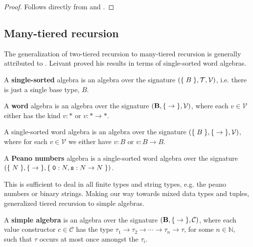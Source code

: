 \begin{proof} Follows directly from  and
. \end{proof}

\subsection{Many-tiered recursion}

The generalization of two-tiered recursion to many-tiered recursion is
generally attributed to \cite{leivant-1995}. Leivant proved his results in
terms of single-sorted word algebras.

\begin{definition} A \textbf{single-sorted} algebra is an algebra over the
signature ${\mathopen{}\left({\mathopen{}\left\{\mathrel{}{B}\mathrel{}\right\}\mathclose{}, \mathcal{T}, \mathcal{V}}\right)\mathclose{}}$, i.e. there is just a single
base type, $B$. \end{definition}

\begin{definition} A \textbf{word} algebra is an algebra over the signature
${\mathopen{}\left({\mathbf{B}, \mathopen{}\left\{\mathrel{}{\rightarrow}\mathrel{}\right\}\mathclose{}, \mathcal{V}}\right)\mathclose{}}$, where each $v \in
\mathcal{V}$ either has the kind $v : *$ or $v : *\rightarrow *$.
\end{definition}

\begin{example} A single-sorted word algebra is an algebra over the signature
${\mathopen{}\left({\mathopen{}\left\{\mathrel{}{B}\mathrel{}\right\}\mathclose{},\mathopen{}\left\{\mathrel{}{\rightarrow}\mathrel{}\right\}\mathclose{}, \mathcal{V}}\right)\mathclose{}}$, where for each $v \in
\mathcal{V}$ we either have $v : B$ or $v : B\rightarrow B$. \end{example}

\begin{definition} A \textbf{Peano numbers} algebra is a single-sorted word
algebra over the signature ${\mathopen{}\left({\mathopen{}\left\{\mathrel{}{N}\mathrel{}\right\}\mathclose{}, \mathopen{}\left\{\mathrel{}{\rightarrow}\mathrel{}\right\}\mathclose{},\mathopen{}\left\{\mathrel{}{\mathtt{0} : N,
\mathtt{s} : N \rightarrow N}\mathrel{}\right\}\mathclose{}}\right)\mathclose{}}$. \end{definition}


This is sufficient to deal in all finite types and string types, e.g.  the
peano numbers or binary strings. Making our way towards mixed data types and
tuples, \cite{marion-2003} generalized tiered recursion to simple algebras.
 
\begin{definition} A \textbf{simple algebra} is an algebra over the signature
${\mathopen{}\left({\mathbf{B}, \mathopen{}\left\{\mathrel{}{\rightarrow}\mathrel{}\right\}\mathclose{}, \mathcal{C}}\right)\mathclose{}}$, where each value constructor
$c \in \mathcal{C}$ has the type $\tau_1 \rightarrow \tau_2 \rightarrow \cdots
\rightarrow \tau_n \rightarrow \tau$, for some $n\in \mathbb{N}$, such that
$\tau$ occurs at most once amongst the $\tau_i$.  \end{definition}


